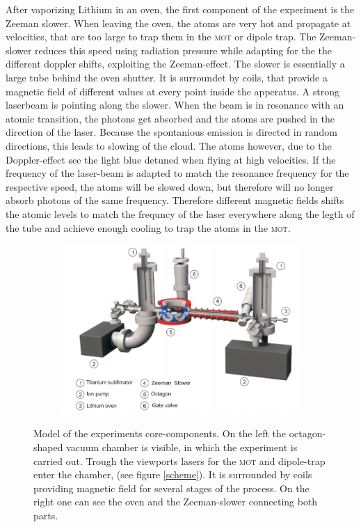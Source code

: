 After vaporizing Lithium in an oven, the first component of the experiment is the Zeeman slower. When leaving the oven, the atoms are very hot and propagate at velocities, that are too large to trap them in the \textsc{mot} or dipole trap. The Zeeman-slower reduces this speed using radiation pressure while adapting for the the different doppler shifts, exploiting the Zeeman-effect. The slower is essentially a large tube behind the oven shutter. It is surroundet by coils, that provide a magnetic field of different values at every point inside the apperatus. A strong laserbeam is pointing along the slower. When the beam is in resonance with an atomic transition, the photons get absorbed and the atoms are pushed in the direction of the laser. Because the spontanious emission is directed in random directions, this leads to slowing of the cloud. The atoms however, due to the Doppler-effect see the light blue detuned when flying at high velocities. If the frequency of the laser-beam is adapted to match the resonance frequency for the respective speed, the atoms will be slowed down, but therefore will no longer absorb photons of the same frequency. Therefore different magnetic fields shifts the atomic levels to match the frequncy of the laser everywhere along the legth of the tube and achieve enough cooling to trap the atoms in the \textsc{mot}. 
\begin{figure}[h]
\centering
\begin{subfigure}[b]{0.8\textwidth}
                \includegraphics[width=\textwidth]{exsetup}
\end{subfigure}
\caption{Model of the experiments core-components. On the left the octagon-shaped vacuum chamber is visible, in which the experiment is carried out. Trough the viewports lasers for the \textsc{mot} and dipole-trap enter the chamber, (see figure \ref{scheme}). It is surrounded by coils providing magnetic field for several stages of the process. On the right one can see the oven and the Zeeman-slower connecting both parts.}
\label{experiment}
\end{figure}
